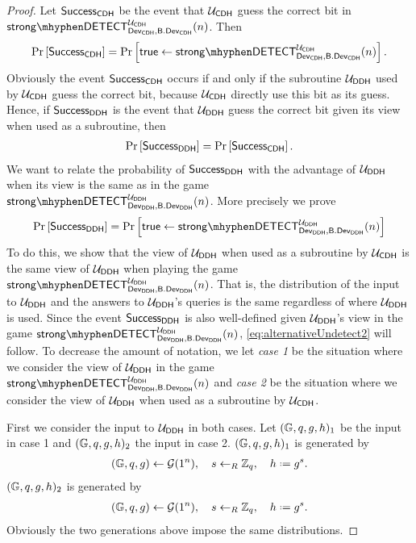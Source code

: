 \begin{proof}
Let $\mathsf{Success}_{\mathsf{CDH}}$ be the event that $\mathcal{U}_{\mathsf{CDH}}$ guess the correct bit in $\strongdetect{\dev_{\CDH}}{\bbdev_{\CDH}}{\user_{\CDH}}$. Then 
\begin{align*}
	\prob{\success_{\CDH}} = \prob{\true\leftarrow\strongdetect{\dev_{\CDH}}{\bbdev_{\CDH}}{\user_{\CDH}}}.
\end{align*}
Obviously the event $\mathsf{Success}_{\mathsf{CDH}}$ occurs if and only if the subroutine $\mathcal{U}_{\mathsf{DDH}}$ used by $\mathcal{U}_{\mathsf{CDH}}$ guess the correct bit, because $\mathcal{U}_{\mathsf{CDH}}$ directly use this bit as its guess. Hence, if $\mathsf{Success}_{\mathsf{DDH}}$ is the event that $\mathcal{U}_{\mathsf{DDH}}$ guess the correct bit given its view when used as a subroutine, then
\begin{align*}
	\operatorname{Pr}\left[{\mathsf{Success}_{\mathsf{DDH}}}\right] = \operatorname{Pr}\left[{\mathsf{Success}_{\mathsf{CDH}}}\right].
\end{align*}
We want to relate the probability of $\mathsf{Success}_{\mathsf{DDH}}$ with the advantage of $\mathcal{U}_{\mathsf{DDH}}$ when its view is the same as in the game $\strongdetect{\dev_{\DDH}}{\bbdev_{\DDH}}{\user_{\DDH}}$. More precisely we prove
\begin{align}
\label{eq:alternativeUndetect2}
	\prob{\success_{\DDH}} = \prob{\true\leftarrow\strongdetect{\dev_{\DDH}}{\bbdev_{\DDH}}{\user_{\DDH}}}
\end{align}
To do this, we show that the view of $\mathcal{U}_{\mathsf{DDH}}$ when used as a subroutine by $\mathcal{U}_{\mathsf{CDH}}$ is the same view of $\mathcal{U}_{\mathsf{DDH}}$ when playing the game $\strongdetect{\dev_{\DDH}}{\bbdev_{\DDH}}{\user_{\DDH}}$. That is, the distribution of the input to $\mathcal{U}_{\mathsf{DDH}}$ and the answers to $\mathcal{U}_{\mathsf{DDH}}$'s queries is the same regardless of where $\mathcal{U}_{\mathsf{DDH}}$ is used. Since the event $\mathsf{Success}_{\mathsf{DDH}}$ is also well-defined given $\mathcal{U}_{\mathsf{DDH}}$'s view in the game $\strongdetect{\dev_{\DDH}}{\bbdev_{\DDH}}{\user_{\DDH}}$, \ref{eq:alternativeUndetect2} will follow. To decrease the amount of notation, we let \emph{case 1} be the situation where we consider the view of $\mathcal{U}_{\mathsf{DDH}}$ in the game $\strongdetect{\dev_{\DDH}}{\bbdev_{\DDH}}{\user_{\DDH}}$ and \emph{case 2} be the situation where we consider the view of $\mathcal{U}_{\mathsf{DDH}}$ when used as a subroutine by $\mathcal{U}_{\mathsf{CDH}}$. 

First we consider the input to $\mathcal{U}_{\mathsf{DDH}}$ in both cases. Let $(\mathbb{G},q,g,h)_1$ be the input in case 1 and $(\mathbb{G},q,g,h)_2$ the input in case 2. $(\mathbb{G},q,g,h)_1$ is generated by
\begin{align*}
(\cgroup,\order,\generator)\leftarrow \groupgen(1^n),\quad s\unileft\Zq,\quad h\defeq g^s.
\end{align*} 
$(\mathbb{G},q,g,h)_2$ is generated by
\begin{align*}
(\cgroup,\order,\generator)\leftarrow \groupgen(1^n),\quad s\unileft\Zq,\quad h\defeq g^s.
\end{align*} 
Obviously the two generations above impose the same distributions.


\end{proof}
